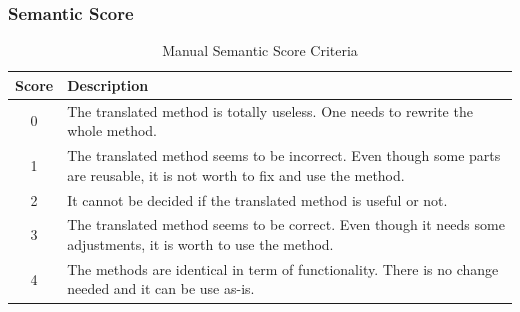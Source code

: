 



\subsubsection{\textbf{Semantic Score}}
\begin{table}
\caption{Manual Semantic Score Criteria}
\begin{tabular}{|c|p{6.5cm}|}
\hline
Score & Description \\
\hline
0 & The translated method is totally useless. One needs to rewrite the whole method. \\
\hline
1 & The translated method seems to be incorrect. Even though some parts are reusable, it is not worth to fix and use the method. \\
\hline
2 &  It cannot be decided if the translated method is useful or not. \\
\hline
3 & The translated method seems to be correct. Even though it needs some adjustments, it is worth to use the method. \\
\hline
4 & The methods are identical in term of functionality. There is no change needed and it can be use as-is. \\
\hline
\end{tabular}
\label{table:criteria}
\end{table}


